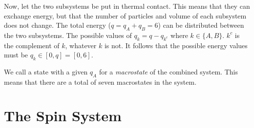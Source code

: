 \documentclass[10pt, a4paper]{amsart}
\begin{document}
Now, let the two subsystems be put in thermal contact. This means that they can exchange energy, but that the number of particles and volume of each subsystem does not change. The total energy ($q=q_A+q_B=6$) can be distributed between the two subsystems. The possible values of $q_k=q-q_{k^c}$ where $k \in \{A,B\}$. $k^c$ is the complement of $k$, whatever $k$ is not. It follows that the possible energy values must be $q_k \in [0,q]=[0,6]$.

We call a state with a given $q_A$ for a \emph{macrostate} of the combined system. This means that there are a total of seven macrostates in the system. 
\section{The Spin System}
\end{document}
